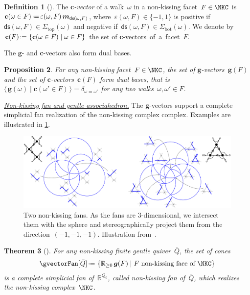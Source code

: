 \documentclass{amsart}
\newtheorem{theorem}{Theorem}[section]
\newtheorem{proposition}[theorem]{Proposition}
\theoremstyle{definition}
\newtheorem{definition}[theorem]{Definition}
\newcommand{\R}{\mathbb{R}} %
\renewcommand{\b}[1]{{\boldsymbol{#1}}} %
\newcommand{\set}[2]{\left\{ #1 \;\middle|\; #2 \right\}} %
\newcommand{\bigdotprod}[2]{\big\langle \, #1 \; \big| \; #2 \, \big\rangle} %
\newcommand{\eqdef}{\mbox{\,\raisebox{0.2ex}{\scriptsize\ensuremath{\mathrm:}}\ensuremath{=}\,}} %
\newcommand{\darkblue}{\color{darkblue}} %
\newcommand{\defn}[1]{\textsl{\darkblue #1}} %
\newcommand{\para}[1]{\medskip\noindent\uline{\textit{#1.}}} %
\newcommand{\multiplicityVector}{\b{m}} %
\newcommand{\gvector}[1]{\b{g}(#1)} %
\newcommand{\gvectors}[1]{\b{g}(#1)} %
\newcommand{\cvector}[2]{\mathbf{c}(#2 \in #1)} %
\newcommand{\cvectors}[1]{\mathbf{c}(#1)} %
\newcommand{\quiver}{\bar Q} %
\renewcommand{\top}{\mathrm{top}} %
\newcommand{\bottom}{\mathrm{bot}} %
\newcommand{\distinguishedString}[2]{\mathsf{ds}(#1,#2)} %
\newcommand{\distinguishedSign}[2]{\varepsilon(#1,#2)} %
\begin{document}
\begin{definition}[{\cite[Def.~{4.11}]{PaluPilaudPlamondon-nonkissing}}]
The \defn{$\b{c}$-vector} of a walk~$\omega$ in a non-kissing facet~${F \in \NKC}$ is~${\cvector{F}{\omega} \eqdef \distinguishedSign{\omega}{F} \, \multiplicityVector_{\distinguishedString{\omega}{F}}}$, where~$\distinguishedSign{\omega}{F} \in \{-1,1\}$ is positive if~${\distinguishedString{\omega}{F} \in \Sigma_\top(\omega)}$ and negative if~${\distinguishedString{\omega}{F} \in \Sigma_\bottom(\omega)}$.
We denote by~$\cvectors{F} \eqdef \set{\cvector{F}{\omega}}{\omega \in F}$ the set of $\b{c}$-vectors~of~a~facet~$F$.
\end{definition}

The $\b{g}$- and $\b{c}$-vectors also form dual bases.

\begin{proposition}
\label{prop:gvectorscvectorsDualBasesGentle}
For any non-kissing facet~$F \in \NKC$, the set of $\b{g}$-vectors~$\gvectors{F}$ and the set of $\b{c}$-vectors~$\cvectors{F}$ form dual bases, that is
\(
{\bigdotprod{\gvector{\omega}}{\cvector{F}{\omega'}} = \delta_{\omega=\omega'}}
\)
for any two walks~$\omega, \omega' \in F$.
\end{proposition}

\para{Non-kissing fan and gentle associahedron}
%
The $\b{g}$-vectors support a complete simplicial fan realization of the non-kissing complex complex.
Examples are illustrated in \cref{fig:nonkissingFans}.

\begin{figure}[h]
	\capstart
	\centerline{\includegraphics[scale=.45]{nonkissingFans}}
	\caption{Two non-kissing fans. As the fans are $3$-dimensional, we intersect them with the sphere and stereographically project them from the direction~$(-1,-1,-1)$. Illustration from~\cite{PaluPilaudPlamondon-nonkissing}.}
	\label{fig:nonkissingFans}
\end{figure}

\begin{theorem}[{\cite[Thm.~4.17]{PaluPilaudPlamondon-nonkissing}}]
\label{thm:nonkissingAsso}
For any non-kissing finite gentle quiver~$\quiver$, the set of cones
\[
\gvectorFan[\quiver] \eqdef \set{\R_{\ge 0} \, \gvectors{F}}{F \text{ non-kissing face of } \NKC}
\]
is a complete simplicial fan of~$\R^{Q_0}$, called \defn{non-kissing fan} of~$\quiver$, which realizes the non-kissing complex~$\NKC$.
\end{theorem}
\end{document}
